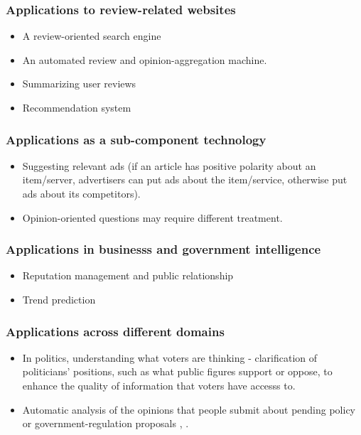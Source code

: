 \documentclass{article}
\begin{document}
\begin{multicols}{2}
    \subsubsection{Applications to review-related websites}
    \begin{itemize}
      \item A review-oriented search engine
      \item An automated review and opinion-aggregation machine.
      \item Summarizing user reviews
      \item Recommendation system
    \end{itemize}
    \subsubsection{Applications as a sub-component technology}
    \begin{itemize}
      \item Suggesting relevant ads (if an article has positive polarity about
an  item/server, advertisers can put ads about the item/service, otherwise put
ads  about its competitors).
      \item Opinion-oriented questions may require different treatment.
    \end{itemize}
    \subsubsection{Applications in businesss and government intelligence}
    \begin{itemize}
      \item Reputation management and public relationship
      \item Trend prediction
    \end{itemize}
    \subsubsection{Applications across different domains}
    \begin{itemize}
      \item In politics, understanding what voters are thinking - clarification
of politicians' positions, such as what public figures support or oppose, to
enhance the quality of information that voters have accesss to.      
      \item Automatic analysis of the opinions that people submit about pending
policy or government-regulation proposals \citet{Cynthia2006}, \citet{Kwon2006}.
    \end{itemize}


\end{multicols}
\end{document}
